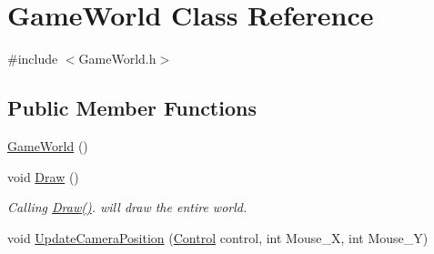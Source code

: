 \hypertarget{class_game_world}{}\section{Game\+World Class Reference}
\label{class_game_world}


{\ttfamily \#include $<$Game\+World.\+h$>$}

\subsection*{Public Member Functions}
\begin{DoxyCompactItemize}
\item 
\hyperlink{class_game_world_a681994123c12833d43c957d6cfb33765}{Game\+World} ()
\item 
void \hyperlink{class_game_world_a275418607d8286979b276f165ad5876b}{Draw} ()
\begin{DoxyCompactList}\small\item\em Calling \hyperlink{class_game_world_a275418607d8286979b276f165ad5876b}{Draw()}. will draw the entire world. \end{DoxyCompactList}\item 
void \hyperlink{class_game_world_a9fa019e8e1d4bbc8e8c101352a73b17a}{Update\+Camera\+Position} (\hyperlink{common_8h_a0da83e35f29c11f7f3c637234f2149f9}{Control} control, int Mouse\+\_\+\+X, int Mouse\+\_\+\+Y)
\end{DoxyCompactItemize}
